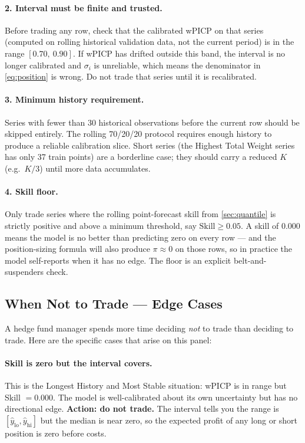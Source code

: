 \paragraph{2. Interval must be finite and trusted.}
Before trading any row, check that the calibrated wPICP on that series (computed on rolling historical validation data, not the current period) is in the range $[0.70,\ 0.90]$. If wPICP has drifted outside this band, the interval is no longer calibrated and $\sigma_i$ is unreliable, which means the denominator in \cref{eq:position} is wrong. Do not trade that series until it is recalibrated.

\paragraph{3. Minimum history requirement.}
Series with fewer than 30 historical observations before the current row should be skipped entirely. The rolling 70/20/20 protocol requires enough history to produce a reliable calibration slice. Short series (the Highest Total Weight series has only 37 train points) are a borderline case; they should carry a reduced $K$ (e.g.\ $K/3$) until more data accumulates.

\paragraph{4. Skill floor.}
Only trade series where the rolling point-forecast skill from \cref{sec:quantile} is strictly positive and above a minimum threshold, say $\text{Skill} \geq 0.05$. A skill of $0.000$ means the model is no better than predicting zero on every row --- and the position-sizing formula will also produce $\pi \approx 0$ on those rows, so in practice the model self-reports when it has no edge. The floor is an explicit belt-and-suspenders check.

\subsection{When Not to Trade --- Edge Cases}

A hedge fund manager spends more time deciding \emph{not} to trade than deciding to trade. Here are the specific cases that arise on this panel:

\paragraph{Skill is zero but the interval covers.}
This is the Longest History and Most Stable situation: wPICP is in range but Skill $= 0.000$. The model is well-calibrated about its own uncertainty but has no directional edge. \textbf{Action: do not trade.} The interval tells you the range is $[\hat{y}_{\text{lo}}, \hat{y}_{\text{hi}}]$ but the median is near zero, so the expected profit of any long or short position is zero before costs.

